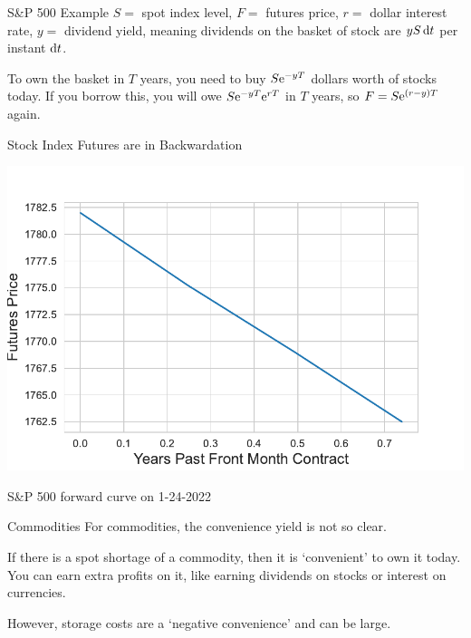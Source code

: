 \documentclass[xcolor=dvipsnames,10pt]{beamer}
\begin{document}
\begin{frame}{S\&P 500 Example}
    $S=$ spot index level, $F=$ futures price, $r=$ dollar interest rate, $y=$ dividend yield, meaning dividends on the basket of stock are $yS\,\mathrm{d} t$ per instant $\mathrm{d} t$.
    
    To own the basket in $T$ years, you need to buy $S\mathrm{e}^{-yT}$ dollars worth of stocks today.  If you borrow this, you will owe $S\mathrm{e}^{-yT}\mathrm{e}^{rT}$ in $T$ years, so $F=S\mathrm{e}^{(r-y)T}$ again.
\end{frame}

\begin{frame}{Stock Index Futures are in Backwardation}
 \begin{center}
        \includegraphics[scale=0.6]{Images/fig_sp500.pdf}
    \end{center}
    S\&P 500 forward curve on 1-24-2022
\end{frame}

\begin{frame}{Commodities}
    For commodities, the convenience yield is not so clear.
    
    If there is a spot shortage of a commodity, then it is `convenient' to own it today.  You can earn extra profits on it, like earning dividends on stocks or interest on currencies.
    
    However, storage costs are a `negative convenience' and can be large.
\end{frame}
\end{document}
